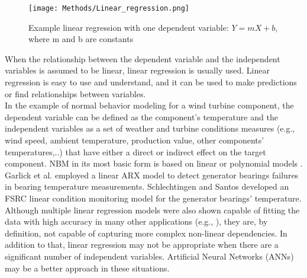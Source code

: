     \begin{figure}[H]
      \begin{center}
        \texttt{[image: Methods/Linear\_regression.png]}
      \end{center}
      \caption{Example linear regression with one dependent variable: $Y = mX + b$, where m and b are constants}
      \label{fig:linear_regression}
  \end{figure}

    When the relationship between the dependent variable and the independent variables is assumed to be linear, 
    linear regression is usually used. Linear regression is easy to use and understand, and it can be used to make predictions or find relationships between variables.\\
    In the example of normal behavior modeling for a wind turbine component, the dependent variable can be defined as the component's temperature 
    and the independent variables as a set of weather and turbine conditions measures (e.g., wind speed, ambient temperature, production value, other components' temperatures,..) 
    that have either a direct or indirect effect on the target component.
    NBM in its most basic form is based on linear or polynomial models \cite{SCADA_NBM_Review}. 
    Garlick et al. \cite{Garlick} employed a linear ARX model to detect generator bearings failures in bearing temperature measurements.
    Schlechtingen and Santos \cite{Schlechtingen} developed an FSRC linear condition monitoring model for the generator bearings' temperature.\\
    Although multiple linear regression models were also shown capable of fitting the data with high accuracy in many other applications (e.g., \cite{Linear_Regression_Example_1}), 
    they are, by definition, not capable of capturing more complex non-linear dependencies. In addition to that, linear regression may not be appropriate when there are a significant 
    number of independent variables. Artificial Neural Networks (ANNs) may be a better approach in these situations.


